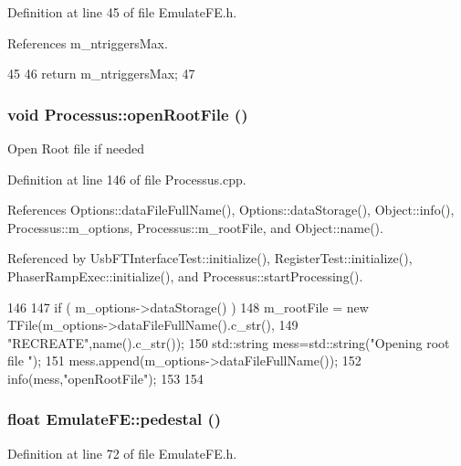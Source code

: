 Definition at line 45 of file EmulateFE.h.

References m\_\-ntriggersMax.


\begin{DoxyCode}
45                  {
46     return m_ntriggersMax;
47   }
\end{DoxyCode}
\hypertarget{classProcessus_aacf6812880c1d1a2bf14a4a39458f443}{
\subsubsection[{openRootFile}]{\setlength{\rightskip}{0pt plus 5cm}void Processus::openRootFile ()}}
\label{classProcessus_aacf6812880c1d1a2bf14a4a39458f443}
Open Root file if needed 

Definition at line 146 of file Processus.cpp.

References Options::dataFileFullName(), Options::dataStorage(), Object::info(), Processus::m\_\-options, Processus::m\_\-rootFile, and Object::name().

Referenced by UsbFTInterfaceTest::initialize(), RegisterTest::initialize(), PhaserRampExec::initialize(), and Processus::startProcessing().


\begin{DoxyCode}
146                                {
147   if ( m_options->dataStorage() ){
148     m_rootFile = new TFile(m_options->dataFileFullName().c_str(),
149                            "RECREATE",name().c_str());
150         std::string mess=std::string("Opening root file ");
151         mess.append(m_options->dataFileFullName());
152         info(mess,"openRootFile");
153   }
154 }
\end{DoxyCode}
\hypertarget{classEmulateFE_a8442db97da7b2a97fe97745e6d8d9161}{
\subsubsection[{pedestal}]{\setlength{\rightskip}{0pt plus 5cm}float EmulateFE::pedestal ()}}
\label{classEmulateFE_a8442db97da7b2a97fe97745e6d8d9161}


Definition at line 72 of file EmulateFE.h.

